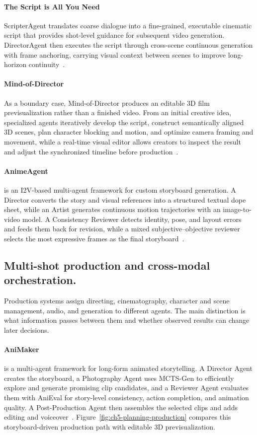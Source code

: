 \paragraph{The Script is All You Need}
ScripterAgent translates coarse dialogue into a fine-grained, executable cinematic script that provides shot-level guidance for subsequent video generation. DirectorAgent then executes the script through cross-scene continuous generation with frame anchoring, carrying visual context between scenes to improve long-horizon continuity~\cite{avg260117737}.

\paragraph{Mind-of-Director}
As a boundary case, Mind-of-Director produces an editable 3D film previsualization rather than a finished video. From an initial creative idea, specialized agents iteratively develop the script, construct semantically aligned 3D scenes, plan character blocking and motion, and optimize camera framing and movement, while a real-time visual editor allows creators to inspect the result and adjust the synchronized timeline before production~\cite{avg260314790}.

\paragraph{AnimeAgent}
 is an I2V-based multi-agent framework for custom storyboard generation. A Director converts the story and visual references into a structured textual dope sheet, while an Artist generates continuous motion trajectories with an image-to-video model. A Consistency Reviewer detects identity, pose, and layout errors and feeds them back for revision, while a mixed subjective--objective reviewer selects the most expressive frames as the final storyboard~\cite{avg260220664}.
 

\subsection{Multi-shot production and cross-modal orchestration.}
Production systems assign directing, cinematography, character and scene management, audio, and generation to different agents. The main distinction is what information passes between them and whether observed results can change later decisions.

\paragraph{AniMaker}
 is a multi-agent framework for long-form animated storytelling. A Director Agent creates the storyboard, a Photography Agent uses MCTS-Gen to efficiently explore and generate promising clip candidates, and a Reviewer Agent evaluates them with AniEval for story-level consistency, action completion, and animation quality. A Post-Production Agent then assembles the selected clips and adds editing and voiceover~\cite{avg250610540}. Figure~\ref{fig:ch5-planning-production} compares this storyboard-driven production path with editable 3D previsualization.

